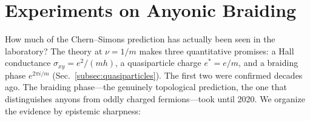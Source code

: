 %
%
%
%
%
%
%
%
%

\section{Experiments on Anyonic Braiding}
\label{sec:experiments}

How much of the Chern--Simons prediction has actually been seen in the laboratory?  The theory at $\nu = 1/m$ makes three quantitative promises: a Hall conductance $\sigma_{xy} = e^2/(mh)$, a quasiparticle charge $e^* = e/m$, and a braiding phase $e^{2\pi i/m}$ (Sec.~\ref{subsec:quasiparticles}).  The first two were confirmed decades ago.  The braiding phase---the genuinely topological prediction, the one that distinguishes anyons from oddly charged fermions---took until 2020.  We organize the evidence by epistemic sharpness:

